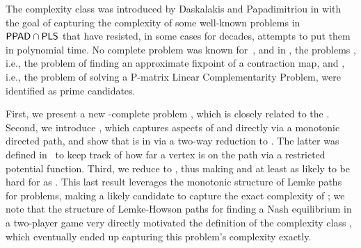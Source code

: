 The complexity class \CLS was introduced by Daskalakis and Papadimitriou in \cite{daskalakis2011continuous} with the goal of capturing the complexity of some well-known problems in $\mathsf{PPAD} \cap \mathsf{PLS}$ that have resisted, in some cases for decades, attempts to put them in polynomial time.  No complete problem was known for~\CLS, and in \cite{daskalakis2011continuous}, the problems \CM, i.e., the problem of finding an approximate fixpoint of a contraction map, and \PLCP, i.e., the problem of solving a P-matrix Linear Complementarity Problem, were identified as prime candidates. 

First, we present a new \CLS-complete problem \MMCM, which is closely related to the \CM. Second, we introduce \EOPL, which captures aspects of \PPAD and \PLS directly via a monotonic directed path, and show that \EOPL is in \CLS via a two-way reduction to \EOML. The latter was defined in~\cite{hubavcek2017hardness} to keep track of how far a vertex is on the \PPAD path via a restricted potential function.  Third, we reduce \PLCP to \EOPL, thus making \EOPL and \EOML at least as likely to be hard for \CLS as \PLCP. This last result leverages the monotonic structure of Lemke paths for \PLCP problems, making \EOPL a likely candidate to capture the exact complexity of \PLCP; we note that the structure of Lemke-Howson paths for finding a Nash equilibrium in a two-player game very directly motivated the definition of the complexity class \PPAD, which eventually ended up capturing this problem's complexity exactly. 
